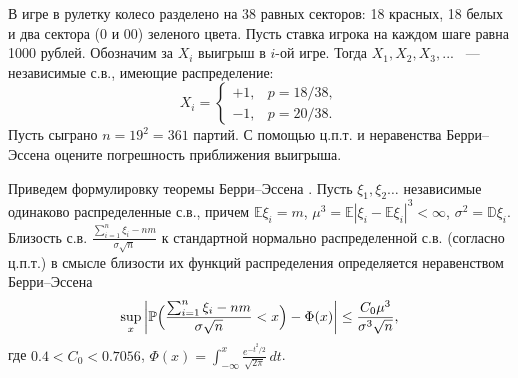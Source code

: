 \begin{problem}
В игре в рулетку колесо разделено на 38 равных секторов: 18 красных, 18 белых и два сектора (0 и 00) зеленого цвета. Пусть ставка игрока на каждом шаге равна 1000 рублей. Обозначим за $X_{i} $ выигрыш в $i$-ой игре. Тогда $X_{1} ,X_{2} ,X_{3} ,...$ ~--- независимые с.в., имеющие распределение: 
\[X_{i} =\left\{\begin{array}{cc} {+1,} & p = 18/38, \\ {-1,} & p = 20/38. \end{array}\right. \] 
Пусть сыграно $n=19^2=361$ партий. С помощью ц.п.т.  и  неравенства Берри--Эссена оцените погрешность приближения выигрыша.
\end{problem}
\begin{remark}
Приведем формулировку теоремы  Берри--Эссена \cite{19}.
\label{sec:BerryEssen}
 Пусть $\xi_1, \xi_2\dots$ независимые одинаково распределенные с.в., причем $\mathbb{E}\xi_i = m$, 
 $\mu^3={\mathbb E}|\xi_i - {\mathbb E}\xi_i|^3<\infty$, $\sigma^2=\mathbb D \xi_i$.
Близость с.в. $\frac{\sum_{i=1}^{n}\xi_i-nm}{\sigma\sqrt{n}}$ к стандартной нормально распределенной с.в. (согласно ц.п.т.) в смысле 
близости их функций распределения определяется неравенством Берри--Эссена 
$$
\sup\limits_x \left| {\mathbb P}\Bigl( \frac{\sum_{i=1}^{n}\xi_i-nm}{\sigma\sqrt{n}}<x \Bigr) - \Phi(x) 
\right| \le \frac{C_0 \mu^3}{\sigma^3 \sqrt{n}} , 
$$
где $0.4<C_0<0.7056$,
$\Phi(x)=\int_{-\infty}^x \frac{e^{-t^2/2}}{\sqrt{2\pi}}\, dt$.
\end{remark}


